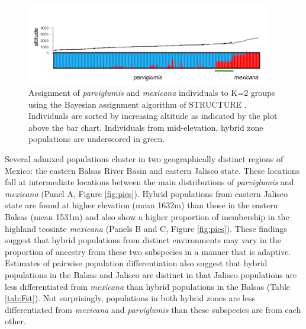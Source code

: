 \begin{figure}[h!] 
  \centering
   \includegraphics[width=0.95\textwidth]{structure.pdf}
    \caption{Assignment of \emph{parviglumis} and \emph{mexicana} individuals to K=2 groups using the Bayesian assignment algorithm of STRUCTURE \citep{Pritchard2000}.  Individuals are sorted by increasing altitude as indicated by the plot above the bar chart. Individuals from mid-elevation, hybrid zone populations are underscored in green.} 
\label{fig:structure}
\end{figure}

Several admixed populations cluster in two geographically distinct regions of Mexico: the eastern Balsas River Basin and eastern Jalisco state.  These locations fall at intermediate locations between the main distributions of \emph{parviglumis} and \emph{mexicana} (Panel A, Figure \ref{fig:pies}).  Hybrid populations from eastern Jalisco state are found at higher elevation (mean 1632m) than those in the eastern Balsas (mean 1531m) and also show a higher proportion of membership in the highland teosinte \emph{mexicana} (Panels B and C, Figure \ref{fig:pies}).  These findings suggest that hybrid populations from distinct environments may vary in the proportion of ancestry from these two subspecies in a manner that is adaptive. Estimates of pairwise population differentiation also suggest that hybrid populations in the Balsas and Jalisco are distinct in that Jalisco populations are less differentiated from \emph{mexicana} than hybrid populations in the Balsas (Table \ref{tab:Fst}).  Not surprisingly, populations in both hybrid zones are less differentiated from \emph{mexicana} and \emph{parviglumis} than these subspecies are from each other. 

